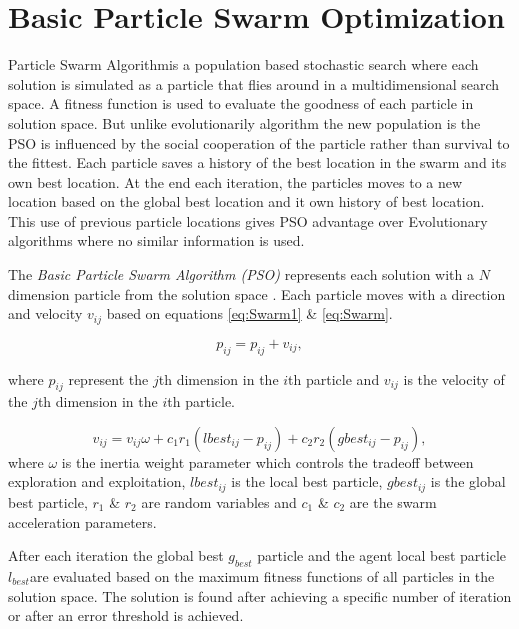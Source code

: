 \documentclass[preprint,1p,times,review]{elsarticle}
\begin{document}
\section{Basic Particle Swarm Optimization}
\label{sec:ParticleSwarmAlgorithm}

 Particle Swarm Algorithm\cite{PSOFirst}is a population based stochastic search where each solution is simulated as a  particle that flies around in a multidimensional search space. A fitness function is used to evaluate the goodness of each particle in solution space. But unlike evolutionarily algorithm the new population is the PSO is influenced by the social cooperation of the particle rather than survival to the fittest. Each particle saves a history of the best location in the swarm and its own best location.  At the end each iteration, the particles moves to a new location based on the global best location and it own history of best location. This use of previous particle locations gives PSO advantage over Evolutionary algorithms where no similar information is used.

 The \textit{Basic Particle Swarm Algorithm (PSO)} represents each solution with a $N$ dimension particle from the solution space \cite{PSOFirst}. Each particle moves with a direction and velocity $v_{ij}$ based on equations \ref{eq:Swarm1} \& \ref{eq:Swarm}.


\begin{equation}
p_{ij}=p_{ij}+v_{ij},
\label{eq:Swarm1}
\end{equation}

where $p_{ij}$ represent the $j$th dimension in the $i$th particle and $v_{ij}$ is the velocity of the $j$th dimension in the $i$th particle.

 \begin{equation}
v_{ij}  = v_{ij} \omega + c_1 r_1 (lbest_{ij}  - p_{ij} ) + c_2 r_2 (gbest_{ij}
- p_{ij} ),
\label{eq:Swarm}
\end{equation}
 where $\omega$ is the inertia weight parameter which controls the tradeoff between exploration and exploitation,  $lbest_{ij}$ is the local best particle, $gbest_{ij}$ is the global best particle, $r_1$ \& $r_2$ are random variables and $c_1$ \& $c_2$ are the swarm acceleration parameters.

 After each iteration the global best $g_{best}$ particle and the agent local best particle $l_{best}$are evaluated based on the maximum fitness functions of all particles in the solution space. The solution is found after achieving a specific number of iteration or after an error threshold is achieved.
\end{document}
